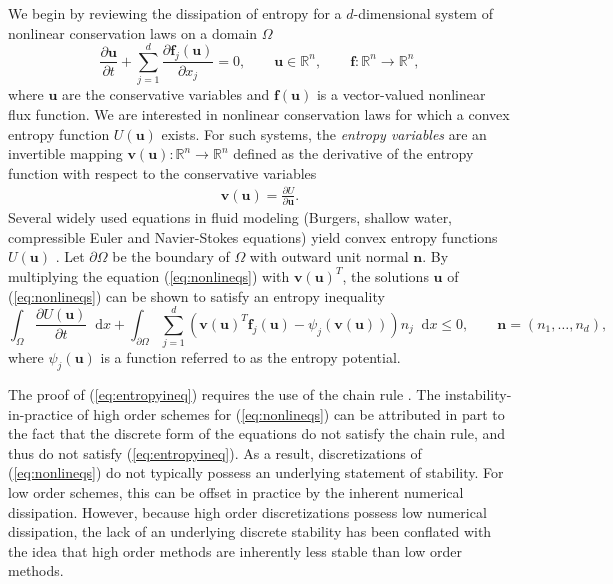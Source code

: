 \documentclass[preprint,10pt]{elsarticle}
\theoremstyle{definition}
\theoremstyle{lemma}
\theoremstyle{corollary}
\theoremstyle{theorem}
\theoremstyle{assumption}
\newcommand{\pd}[2]{\frac{\partial#1}{\partial#2}}
\newcommand{\LRp}[1]{\left( #1 \right)}
\newcommand*\diff[1]{\mathop{}\!{\mathrm{d}#1}}
\begin{document}
We begin by reviewing the dissipation of entropy for a $d$-dimensional system of nonlinear conservation laws on a domain $\Omega$
\begin{equation}
\pd{\bm{u}}{t}  + \sum_{j=1}^d\pd{\bm{f}_j(\bm{u})}{x_j} = 0, \qquad \bm{u}\in \mathbb{R}^n, \qquad \bm{f}:\mathbb{R}^n\rightarrow\mathbb{R}^n,
\label{eq:nonlineqs}
\end{equation}
where $\bm{u}$ are the conservative variables and $\bm{f}(\bm{u})$ is a vector-valued nonlinear flux function.  We are interested in nonlinear conservation laws for which a convex entropy function $U(\bm{u})$ exists.  For such systems, the  \emph{entropy variables} are an invertible mapping $\bm{v}(\bm{u}):\mathbb{R}^n\rightarrow \mathbb{R}^n$ defined as the derivative of the entropy function with respect to the conservative variables 
\begin{align}
\bm{v}(\bm{u}) = \pd{U}{\bm{u}}.%
\label{eq:entropyvarsmap}
\end{align}
Several widely used equations in fluid modeling (Burgers, shallow water, compressible Euler and Navier-Stokes equations) yield convex entropy functions $U(\bm{u})$ \cite{hughes1986new, chen2017entropy}.  Let $\partial \Omega$ be the boundary of $\Omega$ with outward unit normal $\bm{n}$.  By multiplying the equation (\ref{eq:nonlineqs}) with $\bm{v}(\bm{u})^T$, the solutions $\bm{u}$ of (\ref{eq:nonlineqs}) can be shown to satisfy an entropy inequality
\begin{equation}
\int_{\Omega}\pd{U(\bm{u})}{t}\diff{x} + \int_{\partial \Omega} \sum_{j=1}^d \LRp{\bm{v}(\bm{u})^T\bm{f}_j(\bm{u}) - \psi_j\LRp{\bm{v}(\bm{u})}}n_j \diff{x} \leq 0, \qquad \bm{n} = \LRp{n_1,\ldots,n_d}, 
\label{eq:entropyineq}
\end{equation}
where $\psi_j(\bm{u})$ is a function referred to as the entropy potential.  

The proof of (\ref{eq:entropyineq}) requires the use of the chain rule \cite{mock1980systems, harten1983symmetric, dafermos2005compensated}.  The instability-in-practice of high order schemes for (\ref{eq:nonlineqs}) can be attributed in part to the fact that the discrete form of the equations do not satisfy the chain rule, and thus do not satisfy (\ref{eq:entropyineq}).  As a result, discretizations of (\ref{eq:nonlineqs}) do not typically possess an underlying statement of stability.  For low order schemes, this can be offset in practice by the inherent numerical dissipation.  However, because high order discretizations possess low numerical dissipation, the lack of an underlying discrete stability has been conflated with the idea that high order methods are inherently less stable than low order methods.
\end{document}
